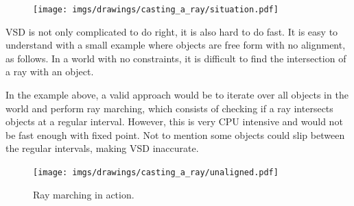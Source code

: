 \begin{figure}[H]
\centering
\texttt{[image: imgs/drawings/casting\_a\_ray/situation.pdf]} 
\end{figure}
VSD is not only complicated to do right, it is also hard to do fast. It is easy to understand with a small example where objects are free form with no alignment, as follows. In a world with no constraints, it is difficult to find the intersection of a ray with an object.\\
\par
In the example above, a valid approach would be to iterate over all objects in the world and perform ray marching, which consists of checking if a ray intersects objects at a regular interval. However, this is very CPU intensive and would not be fast enough with fixed point. Not to mention some objects could slip between the regular intervals, making VSD inaccurate.
\begin{figure}[H]
\centering
\texttt{[image: imgs/drawings/casting\_a\_ray/unaligned.pdf]}
 \caption{Ray marching in action.}
\end{figure}


